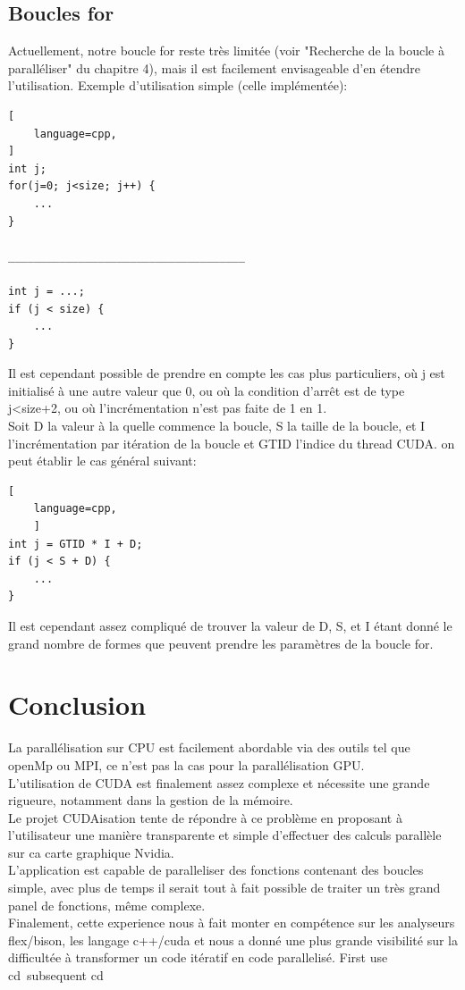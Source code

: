 \documentclass{article}
\begin{document}
	
	\subsection{Boucles for}
	
	Actuellement, notre boucle for reste très limitée (voir "Recherche de la boucle à paralléliser" du chapitre 4), mais il est facilement envisageable d'en étendre l'utilisation.
	Exemple d'utilisation simple (celle implémentée):
			\begin{lstlisting}[
    language=cpp,
]
int j;
for(j=0; j<size; j++) {
	...
}

_____________________________________

int j = ...;
if (j < size) {
	...
}
	\end{lstlisting}
	Il est cependant possible de prendre en compte les cas plus particuliers, où j est initialisé à une autre valeur que 0, ou où la condition d'arrêt est de type j\textless size+2, ou où l'incrémentation n'est pas faite de 1 en 1.
	\\Soit D la valeur à la quelle commence la boucle, S la taille de la boucle, et I l'incrémentation par itération de la boucle et GTID l'indice du thread CUDA. on peut établir le cas général suivant:
	\begin{lstlisting}[
    language=cpp,
    ]
int j = GTID * I + D;
if (j < S + D) {
	...
}
	\end{lstlisting}
	
	Il est cependant assez compliqué de trouver la valeur de D, S, et I étant donné le grand nombre de formes que peuvent prendre les paramètres de la boucle for.

	\section{Conclusion}
	
La parallélisation sur CPU est facilement abordable via des outils tel que openMp ou MPI, ce n'est pas la cas pour la parallélisation GPU.\\
	L'utilisation de CUDA est finalement assez complexe et nécessite une grande rigueure, notamment dans la gestion de la mémoire.\\
	Le projet CUDAisation tente de répondre à ce problème en proposant à l'utilisateur une manière transparente et simple d'effectuer des calculs parallèle sur ca carte graphique Nvidia.\\
	L'application est capable de paralleliser des fonctions contenant des boucles simple, avec plus de temps il serait tout à fait possible de traiter un très grand panel de fonctions, même complexe.\\
	Finalement, cette experience nous à fait monter en compétence sur les analyseurs flex/bison, les langage c++/cuda et nous a donné une plus grande visibilité sur la difficultée à transformer un code itératif en code parallelisé. 
	First use \gls{cd}\    subsequent \gls{cd}
	
\end{document}
